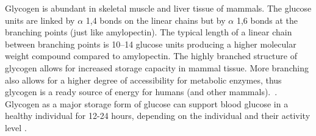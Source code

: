 \documentclass{tufte-handout}
\begin{document}
 Glycogen is abundant in skeletal muscle and liver tissue of mammals. The glucose units are linked by $\alpha$ 1,4 bonds on the linear chains but by $\alpha$ 1,6 bonds at the branching points (just like amylopectin). The typical length of a linear chain between branching points is 10--14 glucose units producing a higher molecular weight compound compared to amylopectin. The highly branched structure of glycogen allows for increased storage capacity in mammal tissue. More branching also allows for a higher degree of accessibility for metabolic enzymes, thus glycogen is a ready source of energy for humans (and other mammals).\  . Glycogen as a major storage form of glucose can support blood glucose in a healthy individual for 12-24 hours, depending on the individual and their activity level \citep{hortonProlongedFastingSignificantly2001}.  



\end{document}
